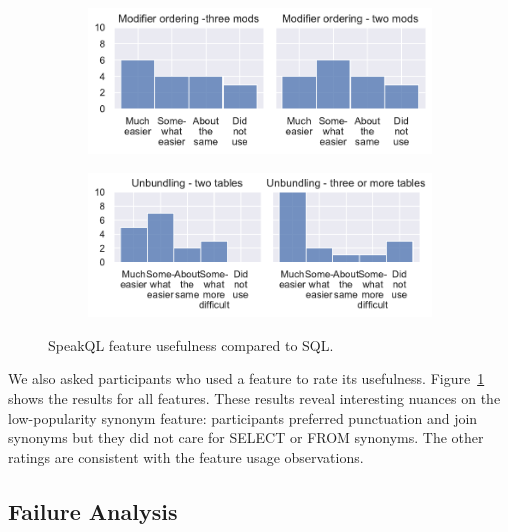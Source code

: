 \begin{figure}[ht]
\begin{subfigure}{0.5\linewidth}
  \end{subfigure}
  \begin{subfigure}{0.5\linewidth}
    \centering
    \includegraphics[width=\linewidth]{figures/survey-feedback/ordering-feedback-2.pdf}
  \end{subfigure}%
  \begin{subfigure}{0.5\linewidth}
    \centering
    \includegraphics[width=\linewidth]{figures/survey-feedback/unbundling-feedback.pdf}
  \end{subfigure}
  \caption{SpeakQL feature usefulness compared to SQL.}
  \label{fig:surveyusefulnessgraphs}
\end{figure}

We also asked participants who used a feature to rate its usefulness. 
Figure~\ref{fig:surveyusefulnessgraphs} shows the results for all features. 
These results reveal interesting nuances on the low-popularity synonym feature: participants preferred punctuation and join synonyms but they did not care for SELECT or FROM synonyms. 
The other ratings are consistent with the feature usage observations. 




\subsection{Failure Analysis} 

